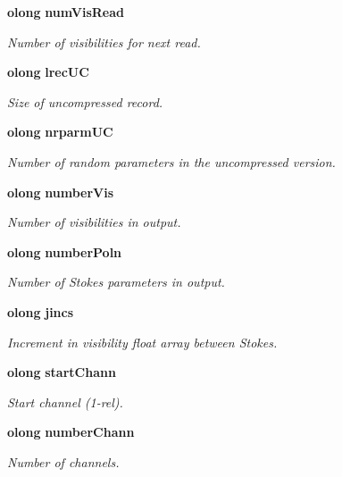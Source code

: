 \begin{CompactItemize}
{\bf olong} {\bf num\-Vis\-Read}
\begin{CompactList}\small\item\em Number of visibilities for next read. \item\end{CompactList}\item 
{\bf olong} {\bf lrec\-UC}
\begin{CompactList}\small\item\em Size of uncompressed record. \item\end{CompactList}\item 
{\bf olong} {\bf nrparm\-UC}
\begin{CompactList}\small\item\em Number of random parameters in the uncompressed version. \item\end{CompactList}\item 
{\bf olong} {\bf number\-Vis}
\begin{CompactList}\small\item\em Number of visibilities in output. \item\end{CompactList}\item 
{\bf olong} {\bf number\-Poln}
\begin{CompactList}\small\item\em Number of Stokes parameters in output. \item\end{CompactList}\item 
{\bf olong} {\bf jincs}
\begin{CompactList}\small\item\em Increment in visibility float array between Stokes. \item\end{CompactList}\item 
{\bf olong} {\bf start\-Chann}
\begin{CompactList}\small\item\em Start channel (1-rel). \item\end{CompactList}\item 
{\bf olong} {\bf number\-Chann}
\begin{CompactList}\small\item\em Number of channels. \item\end{CompactList}\item 

\end{CompactItemize}
